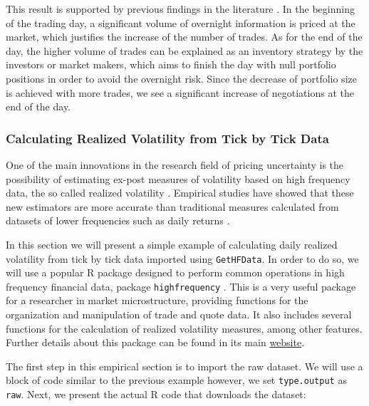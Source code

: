 \documentclass[11pt,]{book}
\begin{document}
This result is supported by previous findings in the literature
\citep[\citet{gross2011machines}]{engle1998autoregressive}. In the
beginning of the trading day, a significant volume of overnight
information is priced at the market, which justifies the increase of the
number of trades. As for the end of the day, the higher volume of trades
can be explained as an inventory strategy by the investors or market
makers, which aims to finish the day with null portfolio positions in
order to avoid the overnight risk. Since the decrease of portfolio size
is achieved with more trades, we see a significant increase of
negotiations at the end of the day.

\subsubsection{Calculating Realized Volatility from Tick by Tick
Data}\label{calculating-realized-volatility-from-tick-by-tick-data}

One of the main innovations in the research field of pricing uncertainty
is the possibility of estimating ex-post measures of volatility based on
high frequency data, the so called realized volatility
\citep[\citet{Ole2002}]{andersen2003modeling}. Empirical studies have
showed that these new estimators are more accurate than traditional
measures calculated from datasets of lower frequencies such as daily
returns \citep[\citet{fleming2003economic},
\citet{Ole2002}]{andersen2003modeling}.

In this section we will present a simple example of calculating daily
realized volatility from tick by tick data imported using
\texttt{GetHFData}. In order to do so, we will use a popular R package
designed to perform common operations in high frequency financial data,
package \texttt{highfrequency} \citep{highfrequency}. This is a very
useful package for a researcher in market microstructure, providing
functions for the organization and manipulation of trade and quote data.
It also includes several functions for the calculation of realized
volatility measures, among other features. Further details about this
package can be found in its main
\href{http://highfrequency.herokuapp.com/}{website}.

The first step in this empirical section is to import the raw dataset.
We will use a block of code similar to the previous example however, we
set \texttt{type.output} as \texttt{raw}. Next, we present the actual R
code that downloads the dataset:
\end{document}
